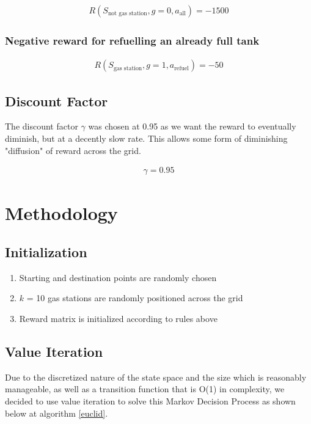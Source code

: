 \documentclass[10pt,twocolumn,letterpaper]{article}
\begin{document}
\begin{gather*}
R(S_{\text{not gas station}}, g = 0,  a_{\text{all}}) = -1500
\end{gather*}

\subsubsection{Negative reward for refuelling an already full tank}

\begin{gather*}
R(S_{\text{gas station}}, g = 1,  a_{\text{refuel}}) = -50
\end{gather*}

\subsection{Discount Factor}

The discount factor $\gamma$ was chosen at 0.95 as we want the reward to eventually diminish, but at a decently slow rate. This allows some form of diminishing "diffusion" of reward across the grid.

\begin{gather*}
\gamma = 0.95
\end{gather*}

\section{Methodology}

\subsection{Initialization}
\begin{enumerate}
\item Starting and destination points are randomly chosen
\item $k$ = 10 gas stations are randomly positioned across the grid
\item Reward matrix is initialized according to rules above
\end{enumerate}

\subsection{Value Iteration}

Due to the discretized nature of the state space and the size which is reasonably manageable, as well as a transition function that is O(1) in complexity, we decided to use value iteration\cite{kochenderfer2015decision} to solve this Markov Decision Process as shown below at algorithm \ref{euclid}.
\end{document}
